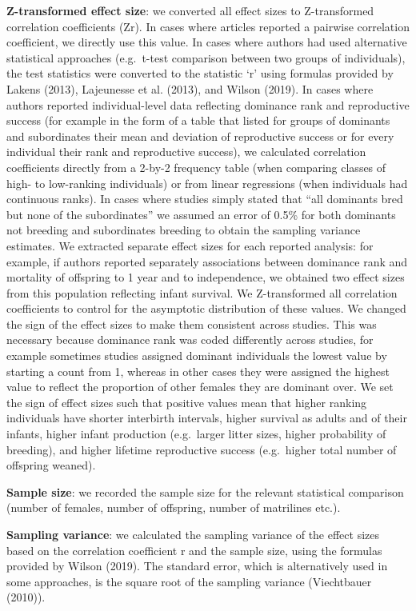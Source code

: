 \documentclass[
]{article}
\begin{document}
\textbf{Z-transformed effect size}: we converted all effect sizes to
Z-transformed correlation coefficients (Zr). In cases where articles
reported a pairwise correlation coefficient, we directly use this value.
In cases where authors had used alternative statistical approaches
(e.g.~t-test comparison between two groups of individuals), the test
statistics were converted to the statistic `r' using formulas provided
by Lakens (2013), Lajeunesse et al. (2013), and Wilson (2019). In cases
where authors reported individual-level data reflecting dominance rank
and reproductive success (for example in the form of a table that listed
for groups of dominants and subordinates their mean and deviation of
reproductive success or for every individual their rank and reproductive
success), we calculated correlation coefficients directly from a 2-by-2
frequency table (when comparing classes of high- to low-ranking
individuals) or from linear regressions (when individuals had continuous
ranks). In cases where studies simply stated that ``all dominants bred
but none of the subordinates'' we assumed an error of 0.5\% for both
dominants not breeding and subordinates breeding to obtain the sampling
variance estimates. We extracted separate effect sizes for each reported
analysis: for example, if authors reported separately associations
between dominance rank and mortality of offspring to 1 year and to
independence, we obtained two effect sizes from this population
reflecting infant survival. We Z-transformed all correlation
coefficients to control for the asymptotic distribution of these values.
We changed the sign of the effect sizes to make them consistent across
studies. This was necessary because dominance rank was coded differently
across studies, for example sometimes studies assigned dominant
individuals the lowest value by starting a count from 1, whereas in
other cases they were assigned the highest value to reflect the
proportion of other females they are dominant over. We set the sign of
effect sizes such that positive values mean that higher ranking
individuals have shorter interbirth intervals, higher survival as adults
and of their infants, higher infant production (e.g.~larger litter
sizes, higher probability of breeding), and higher lifetime reproductive
success (e.g.~higher total number of offspring weaned).

\textbf{Sample size}: we recorded the sample size for the relevant
statistical comparison (number of females, number of offspring, number
of matrilines etc.).

\textbf{Sampling variance}: we calculated the sampling variance of the
effect sizes based on the correlation coefficient r and the sample size,
using the formulas provided by Wilson (2019). The standard error, which
is alternatively used in some approaches, is the square root of the
sampling variance (Viechtbauer (2010)).
\end{document}
